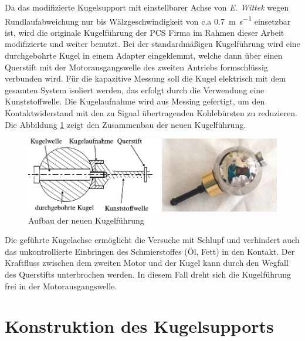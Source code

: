 Da das modifizierte Kugelsupport mit einstellbarer Achse von \textit{E. Wittek} \cite{wittek_2007} wegen Rundlaufabweichung nur bis Wälzgeschwindigkeit von c.a \SI[per-mode=symbol]{0.7}{\meter\per\second} einsetzbar ist, wird die originale Kugelführung der PCS Firma im Rahmen dieser Arbeit modifizierte und weiter benutzt.
Bei der standardmäßigen Kugelführung wird eine durchgebohrte Kugel in einem Adapter eingeklemmt, welche dann über einen Querstift mit der Motorausgangswelle des zweiten Antriebs formschlüssig verbunden wird.
Für die kapazitive Messung soll die Kugel elektrisch mit dem gesamten System isoliert werden, das erfolgt durch die Verwendung eine Kunststoffwelle.
Die Kugelaufnahme wird aus Messing gefertigt, um den Kontaktwiderstand mit den zu Signal übertragenden Kohlebürsten zu reduzieren.
Die Abbildung \ref{fig:aufbau_der_neuen_kugelfuehrung} zeigt den Zusammenbau der neuen Kugelführung.
\begin{figure}[htb]
    \centering
    \includegraphics[]{./images/kugelfuehrung.pdf}
    \caption{Aufbau der neuen Kugelführung}
    \label{fig:aufbau_der_neuen_kugelfuehrung}
\end{figure}
%

Die geführte Kugelachse ermöglicht die Versuche mit Schlupf und verhindert auch das unkontrollierte Einbringen des Schmierstoffes (Öl, Fett) in den Kontakt.
Der Kraftfluss zwischen dem zweiten Motor und der Kugel kann durch den Wegfall des Querstifts unterbrochen werden.
In diesem Fall dreht sich die Kugelführung frei in der Motorausgangswelle.

\section{Konstruktion des Kugelsupports}
\label{sec:konstruktion_des_kugelsupports}

